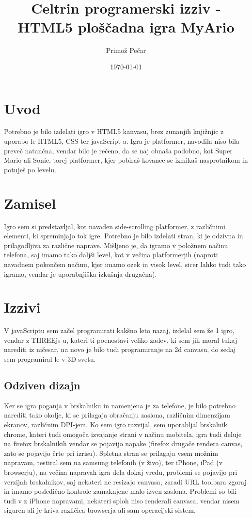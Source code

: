 \documentclass[a4paper,11pt]{article}
\title{Celtrin programerski izziv - HTML5 ploščadna igra MyArio}
\author{Primož Pečar }
\date{\today}
\begin{document}
\maketitle

\section{Uvod}

Potrebno je bilo izdelati igro v HTML5 kanvasu, brez zunanjih knjižnjic z uporabo le HTML5, CSS ter javaScript-a. Igra je platformer, navodila niso bila preveč natančna, vendar bilo je rečeno, da se naj obnaša podobno, kot Super Mario ali Sonic, torej platformer, kjer pobiraš kovance se izmikaš nasprotnikom in potuješ po levelu. 

\section{Zamisel}

Igro sem si predstavljal, kot navaden side-scrolling platformer, z različnimi elementi, ki spreminjajo tok igre. Potrebno je bilo izdelati stran, ki je odzivna in prilagodljiva za različne naprave. Mišljeno je, da igramo v položnem načinu telefona, saj imamo tako daljši level, kot v večina platformerjih (naproti navadnem pokončem načinu, kjer imamo ozek in visok level, sicer lahko tudi tako igramo, vendar je uporabnjiška izkušnja drugačna).

\section{Izzivi}

V javaScriptu sem začel programirati kakšno leto nazaj, izdelal sem že 1 igro, vendar z THREEjs-u, kateri ti poenostavi veliko zadev, ki sem jih moral tukaj narediti iz ničesar, na novo je bilo tudi programiranje na 2d canvasu, do sedaj sem programiral le v 3D svetu. 

\subsection{Odziven dizajn}

Ker se igra poganja v brskalniku in namenjena je za telefone, je bilo potrebno narediti tako okolje, ki se prilagaja obračanju zaslona, različnim dimenzijam ekranov, različnim DPI-jem. Ko sem igro razvijal, sem uporabljal brskalnik chrome, kateri tudi omogoča izvajanje strani v načinu mobitela, igra tudi deluje na firefox brskalnikih vendar se pojavijo napake (firefox drugače rendera canvas, zato se pojavijo črte pri izrisu). Spletna stran se prilagaja vsem možnim napravam, testiral sem na samsung telefonih (v živo), ter iPhone, iPad (v browserju), na večina napravah igra dela dokaj vredu, problemi se pojavijo pri verzijah brskalnikov, saj nekateri ne resizajo canvasa, zaradi URL toolbara zgoraj in imamo posledično kontrole zamaknjene malo izven zaslona. Problemi so bili tudi v z iPhone napravami, nekateri sploh niso renderali canvasa, vendar nisem siguren ali je kriva različica browserja ali sam operacijski sistem.
\end{document}
